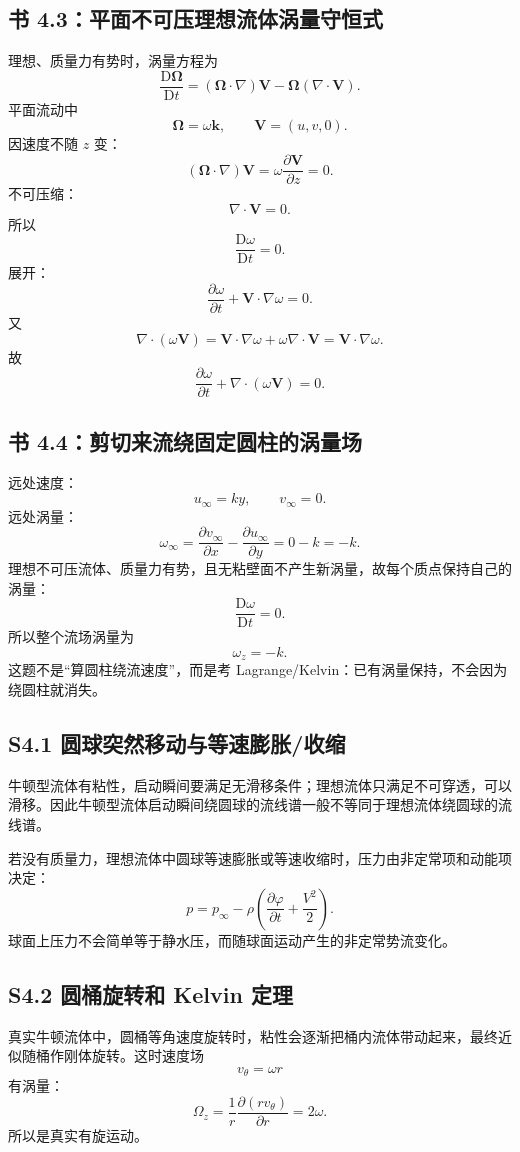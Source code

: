 ﻿\documentclass[UTF8,zihao=-4]{ctexart}
\newcommand{\D}{\mathrm D}
\begin{document}
\subsection*{书 4.3：平面不可压理想流体涡量守恒式}

理想、质量力有势时，涡量方程为
\[
\frac{\D\bm\Omega}{\D t}
=(\bm\Omega\cdot\nabla)\bm V-\bm\Omega(\nabla\cdot\bm V).
\]
平面流动中
\[
\bm\Omega=\omega\bm k,\qquad \bm V=(u,v,0).
\]
因速度不随 \(z\) 变：
\[
(\bm\Omega\cdot\nabla)\bm V
=\omega\frac{\partial\bm V}{\partial z}=0.
\]
不可压缩：
\[
\nabla\cdot\bm V=0.
\]
所以
\[
\frac{\D\omega}{\D t}=0.
\]
展开：
\[
\frac{\partial\omega}{\partial t}
+\bm V\cdot\nabla\omega=0.
\]
又
\[
\nabla\cdot(\omega\bm V)
=\bm V\cdot\nabla\omega+\omega\nabla\cdot\bm V
=\bm V\cdot\nabla\omega.
\]
故
\[
\boxed{
\frac{\partial\omega}{\partial t}
+\nabla\cdot(\omega\bm V)=0.}
\]

\subsection*{书 4.4：剪切来流绕固定圆柱的涡量场}

远处速度：
\[
u_\infty=ky,\qquad v_\infty=0.
\]
远处涡量：
\[
\omega_\infty
=\frac{\partial v_\infty}{\partial x}
-\frac{\partial u_\infty}{\partial y}
=0-k=-k.
\]
理想不可压流体、质量力有势，且无粘壁面不产生新涡量，故每个质点保持自己的涡量：
\[
\frac{\D\omega}{\D t}=0.
\]
所以整个流场涡量为
\[
\boxed{\omega_z=-k.}
\]
这题不是“算圆柱绕流速度”，而是考 Lagrange/Kelvin：已有涡量保持，不会因为绕圆柱就消失。

\subsection*{S4.1 圆球突然移动与等速膨胀/收缩}

牛顿型流体有粘性，启动瞬间要满足无滑移条件；理想流体只满足不可穿透，可以滑移。因此牛顿型流体启动瞬间绕圆球的流线谱一般不等同于理想流体绕圆球的流线谱。

若没有质量力，理想流体中圆球等速膨胀或等速收缩时，压力由非定常项和动能项决定：
\[
p=p_\infty-\rho\left(
\frac{\partial\varphi}{\partial t}
+\frac{V^2}{2}
\right).
\]
球面上压力不会简单等于静水压，而随球面运动产生的非定常势流变化。

\subsection*{S4.2 圆桶旋转和 Kelvin 定理}

真实牛顿流体中，圆桶等角速度旋转时，粘性会逐渐把桶内流体带动起来，最终近似随桶作刚体旋转。这时速度场
\[
v_\theta=\omega r
\]
有涡量：
\[
\Omega_z=\frac1r\frac{\partial(rv_\theta)}{\partial r}=2\omega.
\]
所以是真实有旋运动。
\end{document}
